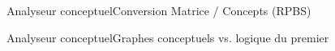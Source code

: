 \begin{frame}{Analyseur conceptuel}{Conversion Matrice / Concepts}
(RPBS)
\end{frame}

\begin{frame}{Analyseur conceptuel}{Graphes conceptuels vs. logique du premier}

\end{frame}